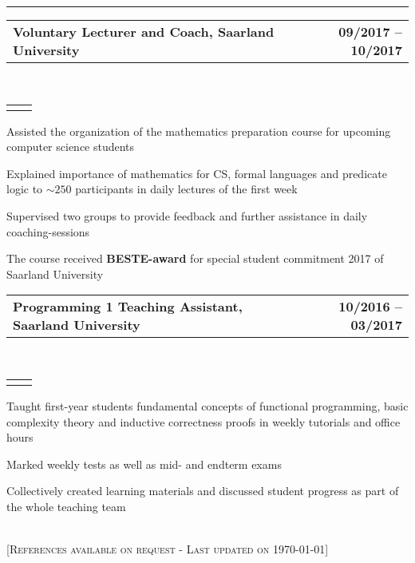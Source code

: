 \documentclass[]{lukas-cv}
\makeatletter
\newcommand{\headerrow}[2]
{\begin{tabular*}{\linewidth}{l@{\extracolsep{\fill}}r}
	\fontspec{Helvetica}\fontsize{12pt}{12pt}\selectfont\bfseries{\color{subheadings}#1} &
	\fontspec{Helvetica}\fontsize{12pt}{12pt}\selectfont\bfseries{\color{subheadings}#2} \\
\end{tabular*}}
\newcommand{\locationrow}[2]
{\begin{tabular*}{\linewidth}{l@{\extracolsep{\fill}}r}
        \color{headings}\scshape\fontspec{Heiti TC Medium}\fontsize{10pt}{12pt}\selectfont{#1}  &
        \color{headings}\scshape\fontspec{Heiti TC Medium}\fontsize{10pt}{12pt}\selectfont{#2}  \\
\end{tabular*}}
\makeatother
\begin{document}
\hrule
\vspace{0.4em}

\noindent
\headerrow{Voluntary Lecturer and Coach, Saarland University}{09/2017 -- 10/2017}
\\
\locationrow{Mathematics Preparation Course}{}
\begin{tightitemize}{1.7em}
    \item Assisted the organization of the mathematics preparation course for upcoming computer science students%
    \item Explained importance of mathematics for CS, formal languages and predicate logic to $\sim250$ participants in daily lectures of the first week
    \item Supervised two groups to provide feedback and further assistance in daily coaching-sessions
    \item The course received \textbf{BESTE-award} for special student commitment 2017 of Saarland University
\end{tightitemize}
\largesectionsep

\noindent
\headerrow{Programming 1 Teaching Assistant, Saarland University}{10/2016 -- 03/2017}
\\
\locationrow{Dependable Systems and Software Group}{}
\begin{tightitemize}{1.7em}
    \item Taught first-year students fundamental concepts of functional programming, basic complexity theory and inductive correctness proofs in weekly tutorials and office hours
    \item Marked weekly tests as well as mid- and endterm exams
    \item Collectively created learning materials and discussed student progress as part of the whole teaching team
\end{tightitemize}
\largesectionsep

\ \\

[\scshape{}\fontsize{10pt}{8pt}\selectfont References available on request - Last updated on \today]
\end{document}
